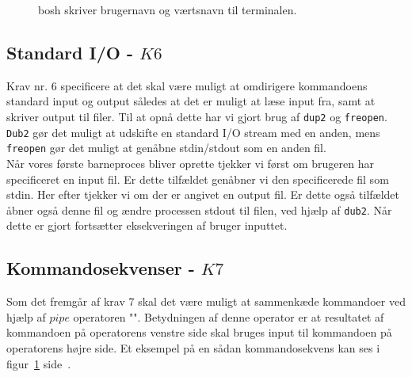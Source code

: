 \documentclass{article}
\begin{document}
\begin{figure}[H]
\center
{}
\caption{bosh skriver brugernavn og værtsnavn til terminalen.}
\label{fig:background}
\end{figure}

\subsection{Standard I/O - $K6$}
Krav nr. 6 specificere at det skal være muligt at omdirigere kommandoens standard input og output således at det er muligt at læse input fra, samt at skriver output til filer. Til at opnå dette har vi gjort brug af \texttt{dup2} og \texttt{freopen}. \texttt{Dub2} gør det muligt at udskifte en standard I/O stream med en anden, mens \texttt{freopen} gør det muligt at genåbne stdin/stdout som en anden fil.\\
Når vores første barneproces bliver oprette tjekker vi først om brugeren har specificeret en input fil. Er dette tilfældet genåbner vi den specificerede fil som stdin. Her efter tjekker vi om der er angivet en output fil. Er dette også tilfældet åbner også denne fil og ændre processen stdout til filen, ved hjælp af \texttt{dub2}. Når dette er gjort fortsætter eksekveringen af bruger inputtet. 

\subsection{Kommandosekvenser - $K7$}
Som det fremgår af krav 7 skal det være muligt at sammenkæde kommandoer ved hjælp af $pipe$ operatoren "\textbar". Betydningen af denne operator er at resultatet af kommandoen på operatorens venstre side skal bruges input til kommandoen på operatorens højre side. Et eksempel på en sådan kommandosekvens kan ses i figur~\ref{fig:background} side~\pageref{fig:background}.\\
\end{document}
